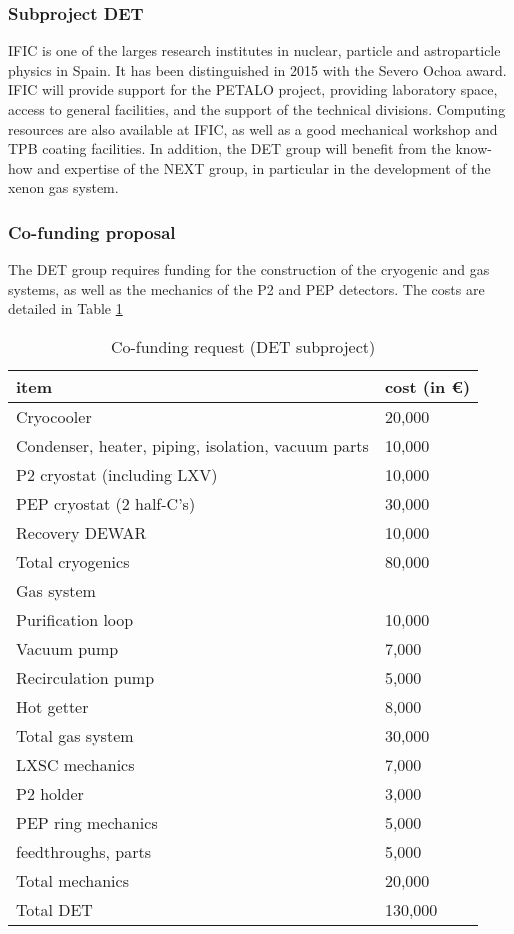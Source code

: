 \subsubsection*{Subproject DET}

IFIC is one of the larges research institutes in nuclear, particle and astroparticle physics in Spain. It has been distinguished in 2015 with the Severo Ochoa award. IFIC will provide support for the PETALO project, providing laboratory space, access to general facilities, and the support of the technical divisions. Computing resources are also available at IFIC, as well as a good mechanical workshop and TPB coating facilities. In addition, the DET group will benefit from the know-how and expertise of the NEXT group, in particular in the development of the xenon gas system.  

\subsubsection*{Co-funding proposal}
The DET group requires funding for the construction of the cryogenic and gas systems, as well as the mechanics of the P2 and PEP detectors. The costs are detailed in Table \ref{tab.costs.det}

\begin{table}[htp!]
\caption{Co-funding request (DET subproject)}
\begin{center}
\begin{tabular}{|l|l|}
\hline
item & cost (in \euro) \\
\hline
Cryocooler &	20,000 \\
Condenser, heater, piping, isolation, vacuum parts &	10,000 \\
P2 cryostat (including LXV)  & 10,000 \\
PEP cryostat  (2 half-C's) & 30,000 \\
Recovery DEWAR &	10,000 \\
\hline
Total cryogenics &	80,000 \\
\hline
Gas system & \\
\hline	
Purification loop &	10,000 \\
Vacuum pump &  	7,000 \\
Recirculation pump & 5,000 \\
Hot getter & 8,000 \\
\hline
Total gas system &	30,000 \\
\hline
LXSC mechanics & 7,000 \\
P2 holder & 3,000 \\
PEP ring mechanics & 5,000 \\
feedthroughs, parts& 5,000 \\
\hline
Total mechanics &	20,000 \\
\hline
Total DET &	130,000 \\
\hline
\end{tabular}
\end{center}
\label{tab.costs.det}
\end{table}%
